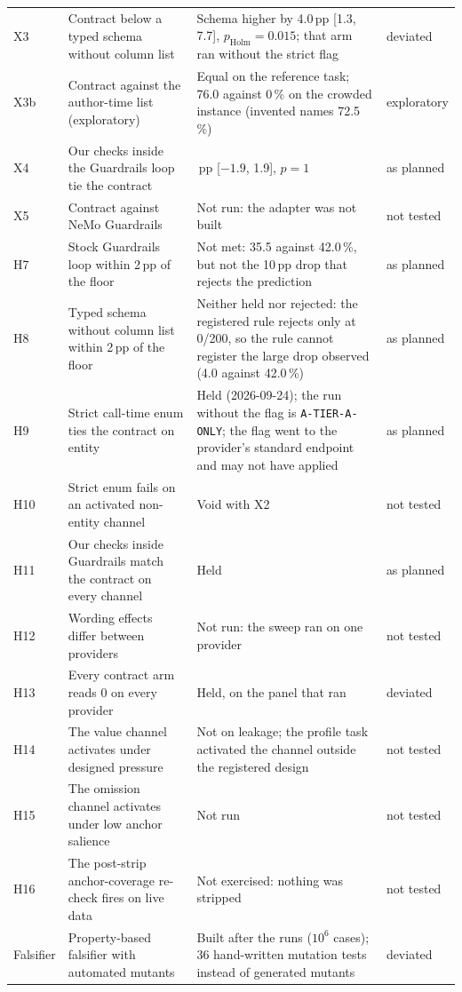 \documentclass[smallextended,natbib]{svjour3}
\begin{document}
{\begin{longtable}{@{}l>{\raggedright\arraybackslash}p{3.2cm}>{\raggedright\arraybackslash}p{4.85cm}l@{}}
X3 & Contract below a typed schema without column list & Schema higher by 4.0\,pp [1.3, 7.7], $p_{\mathrm{Holm}}=0.015$; that arm ran without the strict flag & deviated \\
X3b & Contract against the author-time list (exploratory) & Equal on the reference task; 76.0 against 0\,\% on the crowded instance (invented names 72.5\,\%) & exploratory \\
X4 & Our checks inside the Guardrails loop tie the contract & 0.0\,pp [$-1.9$, 1.9], $p=1$ & as planned \\
X5 & Contract against NeMo Guardrails & Not run: the adapter was not built & not tested \\
H7 & Stock Guardrails loop within 2\,pp of the floor & Not met: 35.5 against 42.0\,\%, but not the 10\,pp drop that rejects the prediction & as planned \\
H8 & Typed schema without column list within 2\,pp of the floor & Neither held nor rejected: the registered rule rejects only at 0/200, so the rule cannot register the large drop observed (4.0 against 42.0\,\%) & as planned \\
H9 & Strict call-time enum ties the contract on entity & Held (2026-09-24); the run without the flag is \texttt{A-TIER-A-ONLY}; the flag went to the provider's standard endpoint and may not have applied & as planned \\
H10 & Strict enum fails on an activated non-entity channel & Void with X2 & not tested \\
H11 & Our checks inside Guardrails match the contract on every channel & Held & as planned \\
H12 & Wording effects differ between providers & Not run: the sweep ran on one provider & not tested \\
H13 & Every contract arm reads 0 on every provider & Held, on the panel that ran & deviated \\
H14 & The value channel activates under designed pressure & Not on leakage; the profile task activated the channel outside the registered design & not tested \\
H15 & The omission channel activates under low anchor salience & Not run & not tested \\
H16 & The post-strip anchor-coverage re-check fires on live data & Not exercised: nothing was stripped & not tested \\
\midrule
Falsifier & Property-based falsifier with automated mutants & Built after the runs ($10^6$ cases); 36 hand-written mutation tests instead of generated mutants & deviated \\

\end{longtable}}
\end{document}
